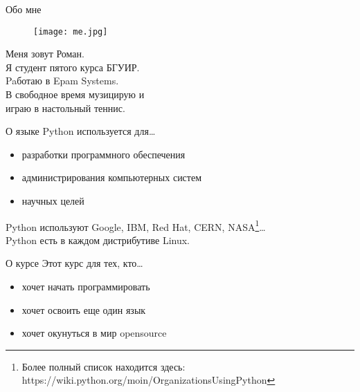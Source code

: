 \documentclass[hyperref={pdftex,unicode}]{beamer}
\begin{document}
\begin{frame}
  \maketitle
\end{frame}

\begin{frame}{Обо мне}
  \begin{minipage}{0.3\linewidth}
    \begin{figure}[H]
      \texttt{[image: me.jpg]}
    \end{figure}
  \end{minipage}
  \hfill
  \begin{minipage}{0.65\linewidth}
    Меня зовут Роман. \\
    Я студент пятого курса БГУИР. \\
    Paботаю в Epam Systems. \\
    В свободное время музицирую и \\
    играю в настольный теннис.
  \end{minipage}
\end{frame}

\begin{frame}{О языке}
  Python используется для\dots
  \begin{itemize}
  \item разработки программного обеспечения
  \item администрирования компьютерных систем
  \item научных целей
  \end{itemize}

  Python используют Google, IBM, Red Hat, CERN, NASA\footnote[frame]{
    Более полный список находится здесь:
    https://wiki.python.org/moin/OrganizationsUsingPython}\dots \\
  Python есть в каждом дистрибутиве Linux.
\end{frame}

\begin{frame}{О курсе}
  Этот курс для тех, кто\dots
  \begin{itemize}
    \item хочет начать программировать
    \item хочет освоить еще один язык
    \item хочет окунуться в мир opensource
  \end{itemize}
\end{frame}
\end{document}
